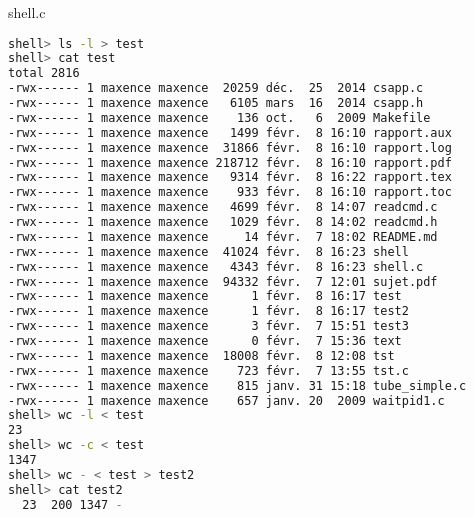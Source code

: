 \documentclass{report}
\begin{document}
		shell.c
		\begin{lstlisting}[frame=single,basicstyle=\footnotesize,language=bash]
shell> ls -l > test
shell> cat test
total 2816
-rwx------ 1 maxence maxence  20259 déc.  25  2014 csapp.c
-rwx------ 1 maxence maxence   6105 mars  16  2014 csapp.h
-rwx------ 1 maxence maxence    136 oct.   6  2009 Makefile
-rwx------ 1 maxence maxence   1499 févr.  8 16:10 rapport.aux
-rwx------ 1 maxence maxence  31866 févr.  8 16:10 rapport.log
-rwx------ 1 maxence maxence 218712 févr.  8 16:10 rapport.pdf
-rwx------ 1 maxence maxence   9314 févr.  8 16:22 rapport.tex
-rwx------ 1 maxence maxence    933 févr.  8 16:10 rapport.toc
-rwx------ 1 maxence maxence   4699 févr.  8 14:07 readcmd.c
-rwx------ 1 maxence maxence   1029 févr.  8 14:02 readcmd.h
-rwx------ 1 maxence maxence     14 févr.  7 18:02 README.md
-rwx------ 1 maxence maxence  41024 févr.  8 16:23 shell
-rwx------ 1 maxence maxence   4343 févr.  8 16:23 shell.c
-rwx------ 1 maxence maxence  94332 févr.  7 12:01 sujet.pdf
-rwx------ 1 maxence maxence      1 févr.  8 16:17 test
-rwx------ 1 maxence maxence      1 févr.  8 16:17 test2
-rwx------ 1 maxence maxence      3 févr.  7 15:51 test3
-rwx------ 1 maxence maxence      0 févr.  7 15:36 text
-rwx------ 1 maxence maxence  18008 févr.  8 12:08 tst
-rwx------ 1 maxence maxence    723 févr.  7 13:55 tst.c
-rwx------ 1 maxence maxence    815 janv. 31 15:18 tube_simple.c
-rwx------ 1 maxence maxence    657 janv. 20  2009 waitpid1.c
shell> wc -l < test
23
shell> wc -c < test
1347
shell> wc - < test > test2
shell> cat test2
  23  200 1347 -
		\end{lstlisting}
\end{document}
